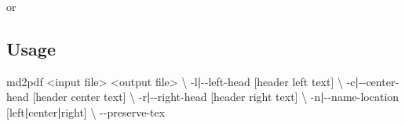 \documentclass[
]{article}
\newenvironment{Shaded}{}{}
\newcommand{\AttributeTok}[1]{\textcolor[rgb]{0.49,0.56,0.16}{#1}}
\newcommand{\DataTypeTok}[1]{\textcolor[rgb]{0.56,0.13,0.00}{#1}}
\newcommand{\ExtensionTok}[1]{#1}
\newcommand{\FunctionTok}[1]{\textcolor[rgb]{0.02,0.16,0.49}{#1}}
\newcommand{\KeywordTok}[1]{\textcolor[rgb]{0.00,0.44,0.13}{\textbf{#1}}}
\newcommand{\NormalTok}[1]{#1}
\newcommand{\OperatorTok}[1]{\textcolor[rgb]{0.40,0.40,0.40}{#1}}
\newcommand{\StringTok}[1]{\textcolor[rgb]{0.25,0.44,0.63}{#1}}
\newcommand{\VariableTok}[1]{\textcolor[rgb]{0.10,0.09,0.49}{#1}}
\begin{document}
\begin{Shaded}
\end{Shaded}

or

\begin{Shaded}
\end{Shaded}

\hypertarget{usage}{%
\subsection{Usage}\label{usage}}

\begin{Shaded}
\begin{Highlighting}[]
\ExtensionTok{md2pdf} \OperatorTok{\textless{}}\NormalTok{input file}\OperatorTok{\textgreater{}} \OperatorTok{\textless{}}\NormalTok{output file}\OperatorTok{\textgreater{}} \DataTypeTok{\textbackslash{}}
    \AttributeTok{{-}l}\KeywordTok{|}\ExtensionTok{{-}{-}left{-}head}\NormalTok{ [header left text] }\DataTypeTok{\textbackslash{}}
    \AttributeTok{{-}c}\KeywordTok{|}\ExtensionTok{{-}{-}center{-}head}\NormalTok{ [header center text] }\DataTypeTok{\textbackslash{}}
    \AttributeTok{{-}r}\KeywordTok{|}\ExtensionTok{{-}{-}right{-}head}\NormalTok{ [header right text] }\DataTypeTok{\textbackslash{}}
    \AttributeTok{{-}n}\KeywordTok{|}\ExtensionTok{{-}{-}name{-}location}\NormalTok{ [left}\KeywordTok{|}\ExtensionTok{center}\KeywordTok{|}\ExtensionTok{right]} \DataTypeTok{\textbackslash{}}
    \AttributeTok{{-}{-}preserve{-}tex}
\end{Highlighting}
\end{Shaded}
\end{document}
